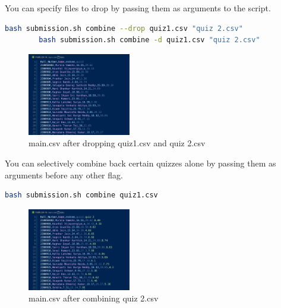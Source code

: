 \documentclass{article}
\begin{document}
    You can specify files to drop by passing them as arguments to the script.
    \begin{lstlisting}[language=bash]
        bash submission.sh combine --drop quiz1.csv "quiz 2.csv"
        bash submission.sh combine -d quiz1.csv "quiz 2.csv"
    \end{lstlisting}
    \begin{figure}[htbp]
        \centering
        \includegraphics[width=0.4\textwidth]{Drop_two_quizzes}
        \caption{main.csv after dropping quiz1.csv and quiz 2.csv}
        \label{fig:combine_drop}
    \end{figure}

    You can selectively combine back certain quizzes alone by passing them as arguments before any other flag.
    \begin{lstlisting}[language=bash]
        bash submission.sh combine quiz1.csv
    \end{lstlisting}
    \begin{figure}[htbp]
        \centering
        \includegraphics[width=0.4\textwidth]{Combine_quiz_2.png}
        \caption{main.csv after combining quiz 2.csv}
        \label{fig:combine_quiz1}
    \end{figure}
\end{document}
